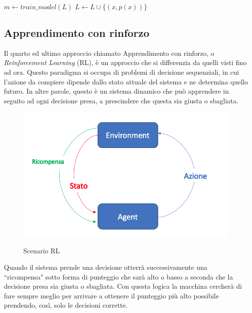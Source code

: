 \documentclass[12pt,italian]{report}
\begin{document}
\begin{algorithmic}[1]
	\Repeat
	\State $m \gets train\_model(L)$
	\State $L \gets L \cup \{(x, p(x))\}$
	\EndIf
	\EndFor
\end{algorithmic}

\subsection{Apprendimento con rinforzo}
Il quarto ed ultimo approccio chiamato Apprendimento con rinforzo, o \emph{Reinforcement Learning} (RL), è un approccio che si differenzia da quelli visti fino ad ora. Questo paradigma si occupa di problemi di decisione sequenziali, in cui l'azione da compiere dipende dallo stato attuale del sistema e ne determina quello futuro. In altre parole, questo è un sistema dinamico che può apprendere in seguito ad ogni decisione presa, a prescindere che questa sia giusta o sbagliata.

\begin{figure}[h!]
	\noindent
	\center
	\label{fig:rl_scenario}
	\includegraphics[scale=0.35]{../img/rl_scenario}
	\caption{Scenario RL}
\end{figure}


Quando il sistema prende una decisione otterrà successivamente una ``ricompensa" sotto forma di punteggio che sarà alto o basso a seconda che la decisione presa sia giusta o sbagliata. Con questa logica la macchina cercherà di fare sempre meglio per arrivare a ottenere il punteggio più alto possibile prendendo, così, solo le decisioni corrette. 
\end{document}
